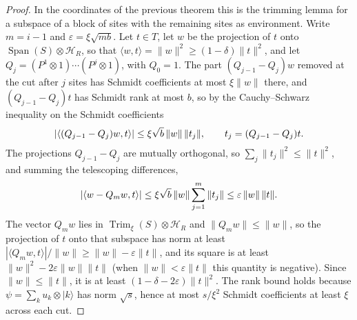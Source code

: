 \begin{proof}
    \leanok
    In the coordinates of the previous theorem this is the trimming lemma for
    a subspace of a block of sites with the remaining sites as environment.
    Write $m=i-1$ and $\varepsilon=\xi\sqrt{mb}$. Let $t\in T$, let $w$ be
    the projection of $t$ onto $\operatorname{Span}(S)\otimes\mathcal H_R$,
    so that $\langle w,t\rangle=\|w\|^2\ge(1-\delta)\|t\|^2$, and let
    $Q_j=(P^1\otimes1)\cdots(P^j\otimes1)$, with $Q_0=1$. The part
    $(Q_{j-1}-Q_j)w$ removed at the cut after $j$ sites has Schmidt
    coefficients at most $\xi\|w\|$ there, and $(Q_{j-1}-Q_j)t$ has
    Schmidt rank at most $b$, so by the Cauchy--Schwarz inequality on the
    Schmidt coefficients
    \begin{align}
        |\langle(Q_{j-1}-Q_j)w,t\rangle|\le\xi\sqrt b\,\|w\|\,\|t_j\|,
        \qquad t_j=(Q_{j-1}-Q_j)t. \notag
    \end{align}
    The projections $Q_{j-1}-Q_j$ are mutually orthogonal, so
    $\sum_j\|t_j\|^2\le\|t\|^2$, and summing the telescoping differences,
    \begin{align}
        |\langle w-Q_mw,t\rangle|
        \le\xi\sqrt b\,\|w\|\sum_{j=1}^{m}\|t_j\|
        \le\varepsilon\,\|w\|\,\|t\|. \notag
    \end{align}
    The vector $Q_mw$ lies in $\operatorname{Trim}_\xi(S)\otimes\mathcal H_R$
    and $\|Q_mw\|\le\|w\|$, so the projection of $t$ onto that subspace
    has norm at least $|\langle Q_mw,t\rangle|/\|w\|\ge\|w\|-\varepsilon\|t\|$,
    and its square is at least $\|w\|^2-2\varepsilon\|w\|\|t\|$ (when
    $\|w\|<\varepsilon\|t\|$ this quantity is negative). Since $\|w\|\le\|t\|$,
    it is at least $(1-\delta-2\varepsilon)\|t\|^2$. The rank bound holds because
    $\psi=\sum_ku_k\otimes|k\rangle$ has norm $\sqrt s$, hence at most
    $s/\xi^2$ Schmidt coefficients at least $\xi$ across each cut.
\end{proof}
